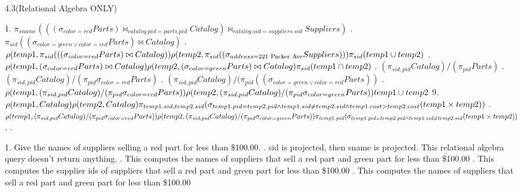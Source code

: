 \begin{problem}{4.3(Relational Algebra ONLY)}
  \begin{solution}
    1.
    $
      \pi_{sname}(((\sigma_{color=red} Parts) \bowtie_{catalog.pid=parts.pid} Catalog)
      \bowtie_{catalog.sid=suppliers.sid} Suppliers)
    $
    .
    $
      \pi_{sid}((\sigma_{color=green\lor color=red} Parts) \bowtie Catalog)
    $
    .\\
    $
      \rho(temp1,
        \pi_{sid}(
          ((\sigma_{color=red} Parts)\bowtie Catalog)
      ) \\
      \rho(temp2,
        \pi_{sid}(
          (\sigma_{address=\text{221 Packer Ave}} Suppliers)
        )
      )\\
      \pi_{sid}(temp1 \cup temp2)
    $
    .
    $
      \rho(temp1, (\sigma_{color=red} Parts) \bowtie Catalog)\\
      \rho(temp2, (\sigma_{color=green} Parts) \bowtie Catalog)\\
      \pi_{sid}(temp1 \cap temp2)
    $
    .
    $
      (\pi_{sid,pid} Catalog)/(\pi_{pid} Parts)
    $
    . $(\pi_{sid,pid} Catalog)/(\pi_{pid}\sigma_{color=red} Parts)$
    .
    $
      (\pi_{sid,pid} Catalog)/(\pi_{pid}((\sigma_{color=green\lor color=red} Parts))
    $
    .
    $
      \rho(temp1, (\pi_{sid,pid} Catalog)/(\pi_{pid}\sigma_{color=red} Parts))\\
      \rho(temp2, (\pi_{sid,pid} Catalog)/(\pi_{pid}\sigma_{color=green} Parts))\\
      temp1 \cup temp2
    $
    9.
    \br
    $
      \rho(temp1, Catalog)\\
      \rho(temp2, Catalog)\\
      \pi_{temp1.sid, temp2.sid}(\sigma_{temp1.pid=temp2.pid\land temp1.sid \ne temp2.sid \land temp1.cost >
          temp2.cost}(temp1 \times temp2))
    $
    .
    $
      \rho(temp1, (\pi_{sid,pid} Catalog)/(\pi_{pid}\sigma_{color=red} Parts))\\
      \rho(temp2, (\pi_{sid,pid} Catalog)/(\pi_{pid}\sigma_{color=green} Parts))\\
      \pi_{temp1.pid}(\sigma_{temp1.pid=temp2.pid \land temp1.sid \ne temp2.sid}(temp1 \times temp2))
    $
    .
    .
  \end{solution}
\end{problem}

\begin{problem}{4.4}
  \begin{solution}
    1. Give the names of suppliers selling a red part for less than \$100.00.
    . sid is projected, then sname is projected. This relational algebra query doesn't return anything.
    . This computes the names of suppliers that sell a red part and green part for less than \$100.00
    . This computes the supplier ids of suppliers that sell a red part and green part for less than \$100.00
    . This computes the names of suppliers that sell a red part and green part for less than \$100.00
  \end{solution}
\end{problem}

